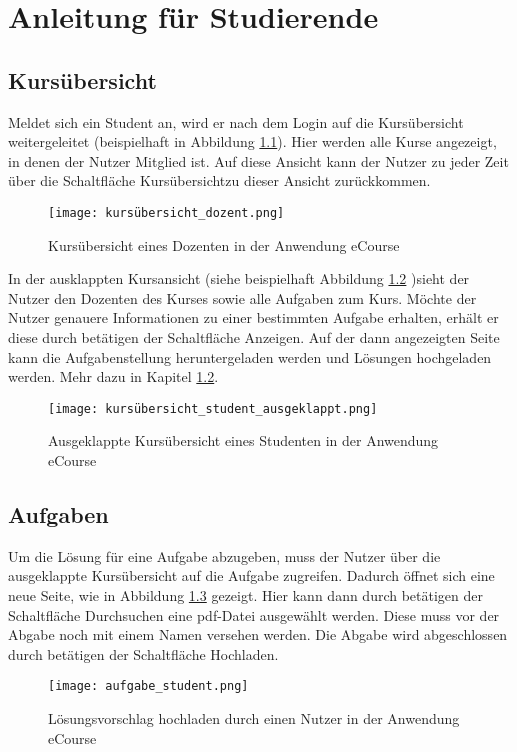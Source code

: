 \chapter{Anleitung für Studierende}
\label{sec:chap3}

\section{Kursübersicht}

Meldet sich ein Student an, wird er nach dem Login auf die Kursübersicht weitergeleitet (beispielhaft in Abbildung \ref{fib:kursübersicht_student}). Hier werden alle Kurse angezeigt, in denen der Nutzer Mitglied ist.
Auf diese Ansicht kann der Nutzer zu jeder Zeit über die Schaltfläche \glqq Kursübersicht\grqq zu dieser Ansicht zurückkommen. 

\begin{figure}[h]
\centering
\texttt{[image: kursübersicht\_dozent.png]}
\caption{Kursübersicht eines Dozenten in der Anwendung eCourse}
\label{fib:kursübersicht_student}
\end{figure}

In der ausklappten Kursansicht (siehe beispielhaft Abbildung \ref{fib:kursübersicht_student_aus} )sieht der Nutzer den Dozenten des Kurses sowie alle Aufgaben zum Kurs. Möchte der Nutzer genauere Informationen zu einer bestimmten Aufgabe erhalten, erhält er diese durch betätigen der Schaltfläche \glqq Anzeigen\grqq. Auf der dann angezeigten Seite kann die Aufgabenstellung heruntergeladen werden und Lösungen hochgeladen werden. Mehr dazu in Kapitel \ref{sec:aufg}.

\begin{figure}[h]
\centering
\texttt{[image: kursübersicht\_student\_ausgeklappt.png]}
\caption{Ausgeklappte Kursübersicht eines Studenten in der Anwendung eCourse}
\label{fib:kursübersicht_student_aus}
\end{figure}

\section{Aufgaben}
\label{sec:aufg}
Um die Lösung für eine Aufgabe abzugeben, muss der Nutzer über die ausgeklappte Kursübersicht auf die Aufgabe zugreifen. Dadurch öffnet sich eine neue Seite, wie in Abbildung \ref{fib:hochladen} gezeigt. Hier kann dann durch betätigen der Schaltfläche \glqq Durchsuchen\grqq\; eine pdf-Datei ausgewählt werden. Diese muss vor der Abgabe noch mit einem Namen versehen werden. Die Abgabe wird abgeschlossen durch betätigen der Schaltfläche \glqq Hochladen\grqq.
\begin{figure}[h]
\centering
\texttt{[image: aufgabe\_student.png]}
\caption{Lösungsvorschlag hochladen durch einen Nutzer in der Anwendung eCourse}
\label{fib:hochladen}
\end{figure}
